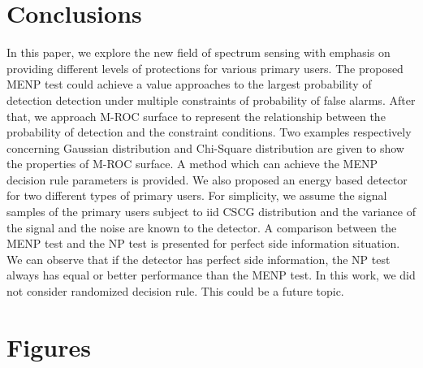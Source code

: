 \documentclass[12pt,journal,a4paper,twoside,onecolumn]{IEEEtran}
\begin{document}
\begin{spacing}{2}
\section{Conclusions}
In this paper, we explore the new field of spectrum sensing with emphasis on providing different levels of protections for various primary users. 
The proposed MENP test could achieve a value approaches to the largest probability of detection detection under multiple constraints of probability of false alarms. 
After that, we approach M-ROC surface to represent the relationship between the probability of detection and the constraint conditions. Two examples respectively concerning Gaussian distribution and Chi-Square distribution are given to show the properties of M-ROC surface. 
A method which can achieve the MENP decision rule parameters is provided. 
We also proposed an energy based detector for two different types of primary users.
For simplicity, we assume the signal samples of the primary users subject to iid CSCG distribution and the variance of the signal and the noise are known to the detector.
A comparison between the MENP test and the NP test is presented for perfect side information situation. We can observe that if the detector has perfect side information, the NP test always has equal or better performance than the MENP test. 
In this work, we did not consider randomized decision rule. This could be a future topic. 



\section{Figures}


\end{spacing}
\end{document}
